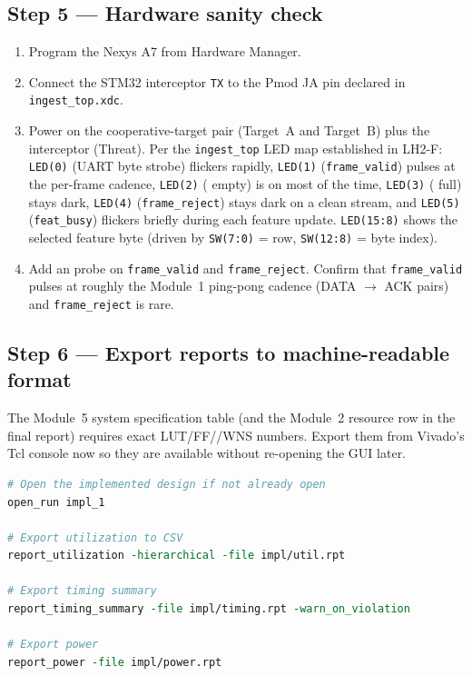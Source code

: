 \documentclass[11pt,letterpaper]{article}
\begin{document}
\newpage
\subsection{Step 5 --- Hardware sanity check}
\begin{enumerate}[leftmargin=2em]
	\item Program the Nexys A7 from Hardware Manager.
	\item Connect the STM32 interceptor \UART{} \texttt{TX} to the Pmod JA pin declared in \texttt{ingest\_top.xdc}.
	\item Power on the cooperative-target pair (Target~A and Target~B) plus the interceptor (Threat). Per the \texttt{ingest\_top} LED map established in LH2-F: \texttt{LED(0)} (UART byte strobe) flickers rapidly, \texttt{LED(1)} (\texttt{frame\_valid}) pulses at the per-frame cadence, \texttt{LED(2)} (\FIFO{} empty) is on most of the time, \texttt{LED(3)} (\FIFO{} full) stays dark, \texttt{LED(4)} (\texttt{frame\_reject}) stays dark on a clean stream, and \texttt{LED(5)} (\texttt{feat\_busy}) flickers briefly during each feature update. \texttt{LED(15:8)} shows the selected feature byte (driven by \texttt{SW(7:0)} = row, \texttt{SW(12:8)} = byte index).
	\item Add an \ILA{} probe on \texttt{frame\_valid} and \texttt{frame\_reject}. Confirm that \texttt{frame\_valid} pulses at roughly the Module~1 ping-pong cadence (DATA $\to$ ACK pairs) and \texttt{frame\_reject} is rare.
\end{enumerate}


\newpage
\subsection{Step 6 --- Export reports to machine-readable format}
The Module~5 system specification table (and the Module~2 resource row in the final report) requires exact \mbox{LUT}/\mbox{FF}/\BRAM{}/WNS numbers. Export them from Vivado's Tcl console now so they are available without re-opening the GUI later.

\begin{lstlisting}[language=Tcl, caption={Run in the Vivado Tcl Console after implementation completes.}]
# Open the implemented design if not already open
open_run impl_1

# Export utilization to CSV
report_utilization -hierarchical -file impl/util.rpt

# Export timing summary
report_timing_summary -file impl/timing.rpt -warn_on_violation

# Export power
report_power -file impl/power.rpt
\end{lstlisting}
\end{document}
